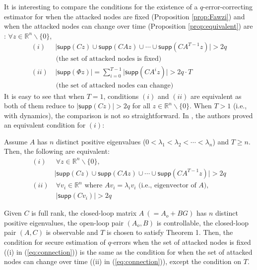 \documentclass[../../thesis.tex]{subfiles}
\begin{document}
It is interesting to compare the conditions for the existence of a $q$-error-correcting estimator for when the attacked nodes are fixed (Proposition \ref{prop:Fawzi}) and when the attacked nodes can change over time (Proposition \ref{prop:equivalent}) are :
$\forall z \in \mathbb{R}^n\backslash \{0 \}$,
\begin{equation}
\begin{aligned}
(i) &~  \lvert \textsf{supp}(Cz) \cup \textsf{supp}(CAz) \cup \cdots \cup \textsf{supp}(CA^{T-1} z) \rvert > 2q  \\& \text{ (the set of attacked nodes is fixed)}\\
(ii) & ~ \lvert \textsf{supp} (\Phi z) \rvert 
     =  \sum_{i=0}^{T-1} \lvert \textsf{supp} (C A^i z) \rvert > 2 q \cdot T \\& \text{ (the set of attacked nodes can change)} 
	\label{eq:connection}
\end{aligned}
\end{equation}
It is easy to see that when $T=1$, conditions $(i)$ and $(ii)$ are equivalent as both of them reduce to $\lvert \textsf{supp} (Cz) \rvert > 2q$ for all $z \in \mathbb{R}^n\backslash \{0 \}$.
When $T>1$ (i.e., with dynamics), the comparison is not so straightforward. In \cite{Fawzi:2014}, the authors proved an equivalent condition for $(i)$:

\begin{lem} \label{lem:distinct}
Assume $A$ has $n$ distinct positive eigenvalues ($0<\lambda_1 < \lambda_2 <\cdots < \lambda_n$) and $T \geq n$. Then, the following are equivalent:
\begin{equation}
\begin{aligned}
 (i) &~ \forall z \in \mathbb{R}^n \backslash \{0\},  \\& \lvert \textsf{supp}(Cz) \cup \textsf{supp}(CAz) \cup \cdots \cup \textsf{supp}(CA^{T-1} z) \rvert > 2q  \\
 (ii)  &~\forall v_i \in \mathbb{R}^n \text{ where }   Av_i = \lambda_i v_i \text{ (i.e., eigenvector of $A$)},\\& ~ \lvert \textsf{supp}(Cv_i) \rvert > 2q \nonumber
\label{eq:condition}
\end{aligned}
\end{equation}
\end{lem}

\begin{proposition}\label{prop:equivalent2}
Given $C$ is full rank, the closed-loop matrix $A~(=A_o+BG)$ has $n$ distinct positive eigenvalues, the open-loop pair $(A_o,B)$ is controllable, the closed-loop pair $(A,C)$ is observable and $T$ is chosen to satisfy Theorem 1. Then, the condition for secure estimation of $q$-errors when the set of attacked nodes is fixed ((i) in (\ref{eq:connection})) is the same as the condition for when the set of attacked nodes can change over time ((ii) in (\ref{eq:connection})), except the condition on $T$.
\end{proposition}
\end{document}
